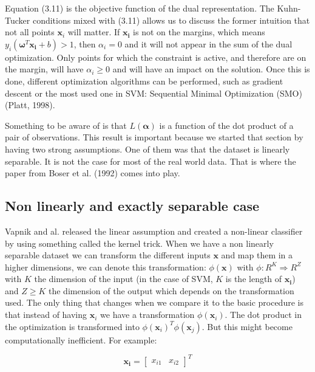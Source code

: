 \documentclass[a4paper,12pt]{article}
\numberwithin{equation}{section}
\begin{document}
Equation (3.11) is the objective function of the dual representation. The Kuhn-Tucker conditions mixed with (3.11) allows us to discuss the former intuition that not all points $\boldsymbol{x}_i$ will matter. If $\boldsymbol{x_i}$ is not on the margins, which means $y_i(\boldsymbol{\omega}^T\boldsymbol{x_i}+b) > 1 $, then $\alpha_i = 0$ and it will not appear in the sum of the dual optimization. Only points for which the constraint is active, and therefore are on the margin, will have $\alpha_i \geq 0 $ and will have an impact on the solution. Once this is done, different optimization algorithms can be performed, such as gradient descent or the most used one in SVM: Sequential Minimal Optimization (SMO) (Platt, 1998). \par
Something to be aware of is that $L(\boldsymbol{\alpha})$ is a function of the dot product of a pair of observations. This result is important because we started that section by having two strong assumptions. One of them was that the dataset is linearly separable. It is not the case for most of the real world data. That is where the paper from Boser et al. (1992) comes into play. 

\newpage
\subsection{Non linearly and exactly separable case}

Vapnik and al. released the linear assumption and created a non-linear classifier by using something called the kernel trick. When we have a non linearly separable dataset we can transform the different inputs $\boldsymbol{x}$ and map them in a higher dimensions, we can denote this transformation: $\phi(\boldsymbol{x})$ with $\phi: R^K \Longrightarrow R^Z$ with $K$ the dimension of the input (in the case of SVM, $K$ is the length of $\boldsymbol{x_i}$) and $Z \geq K$ the dimension of the output which depends on the transformation used. The only thing that changes when we compare it to the basic procedure is that instead of having $\boldsymbol{x}_i$ we have a transformation $\phi(\boldsymbol{x}_i)$. The dot product in the optimization is transformed into $\phi(\boldsymbol{x}_i)^T\phi(\boldsymbol{x}_j)$. But this might become computationally inefficient. For example:

\begin{equation*}
 \boldsymbol{x_i} =
 \begin{bmatrix}
 x_{i1} & x_{i2} 
 \end{bmatrix}^T
\end{equation*}
\end{document}
